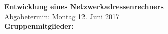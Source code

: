 \begin{titlepage}

\begin{center}

\Large{\titel}\\[12ex]

\huge{\textbf{\Projekt}}\\[1.5ex]
\Large{\textbf{Entwicklung eines Netzwerkadressenrechners}}\\[4ex]

\normalsize
Abgabetermin: Montag 12. Juni 2017\\[3em]
\textbf{Gruppenmitglieder:}\\
\autoren \\[5ex]

\end{center}

\end{titlepage}